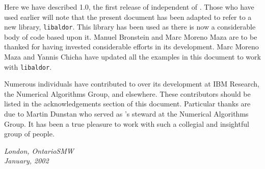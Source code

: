 Here we have described \aldor{} 1.0, the first release of \aldor{}
independent of \axiom{}.   Those who have used \aldor{} earlier will
note that the present document has been adapted to refer to a new library,
{\tt libaldor}.   This library has been used as there is now a considerable
body of \aldor{} code based upon it.  Manuel Bronstein and Marc Moreno Maza
are to be thanked for having invested considerable efforts in its development.
Marc Moreno Maza and Yannis Chicha have updated all the examples in this
document to work with {\tt libaldor}.

Numerous individuals have contributed to \aldor{} over its development
at IBM Research, the Numerical Algorithms Group, and elsewhere.   
These contributors should be listed in the acknowledgements section of 
this document.  Particular thanks are due to Martin Dunstan
who served as \aldor{}'s steward at the Numerical Algorithms Group.
It has been a true pleasure to work with such a collegial and insightful
group of people.  

{\it London, Ontario}\hfill{\it SMW}\\
{\it January, 2002}\hfill
